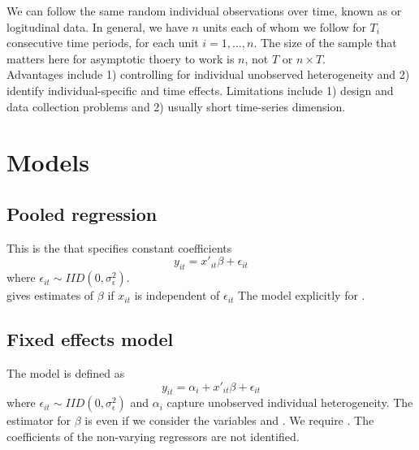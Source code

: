 \ChapterHeading

We can follow the same random individual observations over time, known as  or logitudinal data.
In general, we have $n$ units each of whom we follow for $T_i$ consecutive time periods, for each unit $i=1,\ldots,n$.
The size of the sample that matters here for asymptotic thoery to work is $n$, not $T$ or $n\times T$.\\

Advantages include 1) controlling for individual unobserved heterogeneity and 2) identify individual-specific and time effects.
Limitations include 1) design and data collection problems and 2) usually short time-series dimension.

\section{Models}

\subsection{Pooled regression}

This is the  that specifies constant coefficients
\begin{equation}
    y_{it} = x'_{it}\beta + \epsilon_{it}
\end{equation}
where $\epsilon_{it}\sim IID(0, \sigma^2_{\epsilon})$.\\

 gives  estimates of $\beta$ if $x_{it}$ is independent of $\epsilon_{it}$ 
The model  explicitly for .

\subsection{Fixed effects model}

The model is defined as
\begin{equation}
    y_{it} = \alpha_i + x'_{it}\beta + \epsilon_{it}
\end{equation}
where $\epsilon_{it}\sim IID(0, \sigma^2_{\epsilon})$ and $\alpha_i$ capture unobserved individual heterogeneity.
The estimator for $\beta$ is  even if we consider the variables  and .
We require . The coefficients of the non-varying regressors are not identified.

